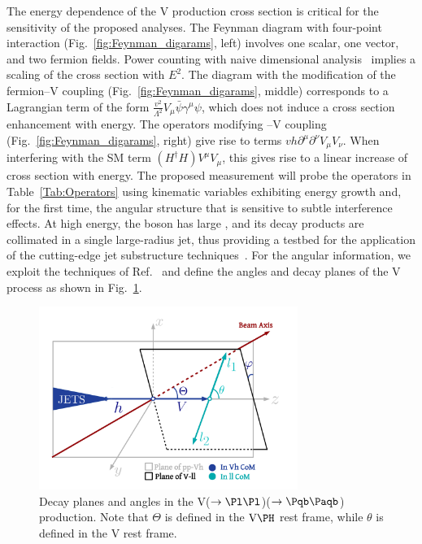 \documentclass[a4paper,11pt]{article}
\newcommand{\Pb}{{{\Pqb}}\xspace}
\newcommand{\PAb}{{{{\Paqb}}}\xspace}
\renewcommand{\PV}{{{{V}}}\xspace}
\newcommand{\VH}{{{\PV}{\PH}}\xspace}
\begin{document}
The energy dependence of the \VH production cross section is critical for the sensitivity of the proposed analyses. 
The Feynman diagram with four-point interaction (Fig.~\ref{fig:Feynman_digarams}, left) involves one scalar, one vector, and two fermion fields.
Power counting with naive dimensional analysis~\cite{Manohar:1983md} implies a scaling of the cross section with $E^2$. 
The diagram with the modification of the fermion--{\PV} coupling (Fig.~\ref{fig:Feynman_digarams}, middle) 
corresponds to a Lagrangian term of the form $\frac{v^2}{{\Lambda}^2} V_{\mu} \bar{\psi} {{\gamma}^{\mu}} {\psi}$, which does not induce a cross section enhancement with energy. 
The operators modifying \PH--\PV coupling (Fig.~\ref{fig:Feynman_digarams}, right) give rise to terms $vh {\partial}^{\mu}{\partial}^{\nu} V_{\mu}V_{\nu}$.
When interfering with the SM term $(H^{\dagger}H) V^{\mu}V_{\mu}$, this gives rise to a linear increase of cross section with energy.
The proposed measurement will probe the operators in Table~\ref{Tab:Operators} 
using kinematic variables exhibiting energy growth and, for the first time, the angular structure that is sensitive to subtle interference effects.
At high energy, the \PH boson has large \pt, and its decay products are collimated in a single large-radius jet, thus providing a testbed for the application of the cutting-edge jet substructure techniques~\cite{Qu:2019gqs,Sirunyan:2020lcu}.
For the angular information, we exploit the techniques of Ref.~\cite{Banerjee:2019twi} and define the angles and decay planes of the \VH process as shown in Fig.~\ref{fig:HelicityFrame}.

\begin{figure}[hbtp]
\begin{center}
\includegraphics[width=0.75\textwidth]{Figures/LHE/TheThreeAnglesVh.pdf}
\end{center}
\caption{
Decay planes and angles in the \PV($\rightarrow \textrm{\Pl} \textrm{\Pl}$)\PH($\rightarrow \Pb \PAb$) production. Note that $\Theta$ is defined in the $\textrm{\PV}\PH$ rest frame, while $\theta$ is defined in the \PV rest frame.
}
\label{fig:HelicityFrame}
\end{figure}
\end{document}
